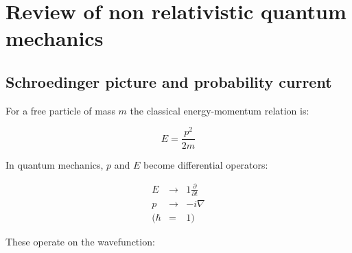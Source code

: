 \chapter{Review of non relativistic quantum mechanics}

\section{Schroedinger picture and probability current}

For a free particle of mass $m$ the classical energy-momentum relation is:

\[
  E = \frac{p^2}{2m}
\]

In quantum mechanics, $p$ and $E$ become differential operators:

\begin{eqnarray*}
  E & \to & 1\frac{\partial}{\partial t} \\
  p & \to & -i \nabla \\
  ( \hbar & = & 1 )
\end{eqnarray*}

These operate on the wavefunction:

